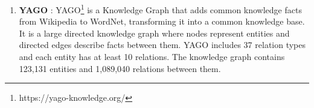 \begin{enumerate}
\item \label{data:yago}\textbf{YAGO} \cite{suchanek2007yago}: YAGO\footnote{https://yago-knowledge.org/} is a Knowledge Graph that adds common knowledge facts from Wikipedia to WordNet, transforming it into a common knowledge base. It is a large directed knowledge graph where nodes represent entities and directed edges describe facts between them. YAGO includes 37 relation types and each entity has at least 10 relations. The knowledge graph contains 123,131 entities and 1,089,040 relations between them.

\end{enumerate}




%